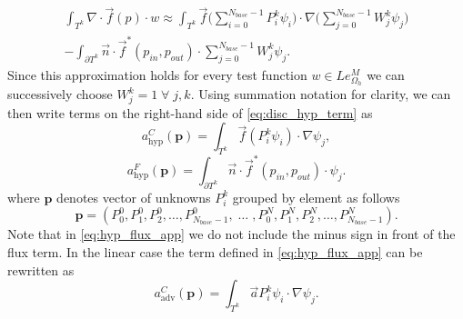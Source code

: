 \begin{multline}
\label{eq:disc_hyp_term}
\int_{T^k} \nabla\cdot \vec{f}(p)\cdot w \approx \int_{T^k}
\vec{f}\Big(\sum\limits_{i=0}^{N_{base} - 1}
P_i^k\psi_i\Big)\cdot\nabla\Big(\sum\limits_{j=0}^{N_{base} - 1}
W_j^k\psi_j\Big)\\
-\int_{\partial{T^k}} \vec{n} \cdot \vec{f}^{*} (p_{in}, p_{out})\cdot
\sum\limits_{j=0}^{N_{base} - 1} W_j^k\psi_j.
\end{multline}
Since this approximation holds for every test function $w \in
Le_{\Omega_h}^{M}$ we can successively choose $W_j^k = 1 \; \forall \;
j, k$. Using summation notation for clarity, we can then write terms on the  right-hand
side of \eqref{eq:disc_hyp_term} as
\begin{equation}
\label{eq:hyp_stiff_app}
a^C_\mathrm{hyp}(\mathbf{p}) = \int_{T^k} \vec{f}(P_i^k\psi_i)\cdot\nabla\psi_j,
\end{equation}
\begin{equation}
\label{eq:hyp_flux_app}
a^F_\mathrm{hyp}(\mathbf{p}) = \int_{\partial{T^k}} \vec{n} \cdot \vec{f}^{*} (p_{in},
p_{out})\cdot\psi_j.
\end{equation}
where $\mathbf{p}$ denotes vector of unknowns $P^k_i$ grouped by element as follows
\begin{equation}
\mathbf{p} = \left(P^0_0, P^0_1, P^0_2, \ldots, P^0_{N_{base}-1}, \; \ldots \; ,
P^{N}_0, P^{N}_1, P^{N}_2, \ldots, P^{N}_{N_{base} - 1}  \right).
\end{equation}
Note that in \eqref{eq:hyp_flux_app} we do not include the minus sign in front
of the flux term. In the linear case the term defined in \eqref{eq:hyp_flux_app} can be
rewritten as
\begin{equation}\label{eq:adv_flux_app}
a^C_\mathrm{adv}(\mathbf{p}) = \int_{T^k} \vec{a}P_i^k\psi_i\cdot\nabla\psi_j.
\end{equation}

